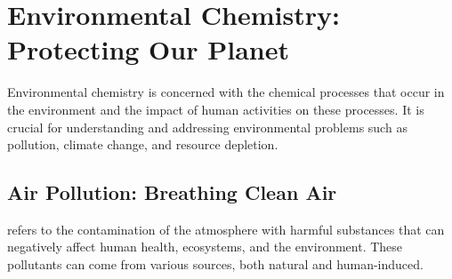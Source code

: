 \section{Environmental Chemistry: Protecting Our Planet}

Environmental chemistry is concerned with the chemical processes that occur in the environment and the impact of human activities on these processes. It is crucial for understanding and addressing environmental problems such as pollution, climate change, and resource depletion.

\subsection{Air Pollution: Breathing Clean Air}

 refers to the contamination of the atmosphere with harmful substances that can negatively affect human health, ecosystems, and the environment.  These pollutants can come from various sources, both natural and human-induced.

